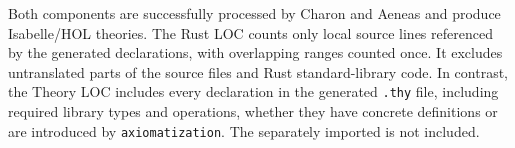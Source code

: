 


Both components are successfully processed by Charon and Aeneas and produce Isabelle/HOL theories.
The Rust LOC counts only local source lines referenced by the generated declarations, with overlapping ranges counted once.
It excludes untranslated parts of the source files and Rust standard-library code.
In contrast, the Theory LOC includes every declaration in the generated \texttt{.thy} file, including required library types and operations, whether they have concrete definitions or are introduced by \texttt{axiomatization}.
The separately imported \rprelude{} is not included.




